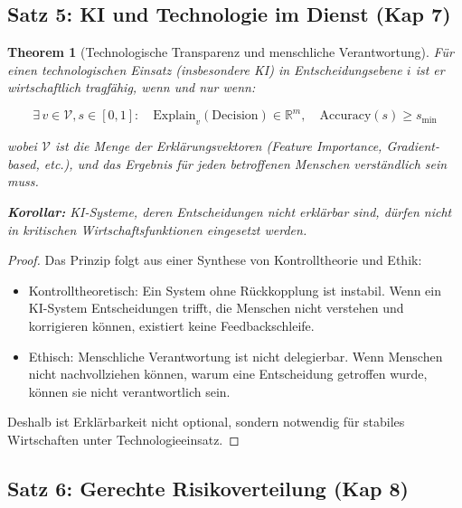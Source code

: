 \documentclass[a4paper, 12pt, twoside, openright]{report}
\newtheorem{theorem}{Theorem}[section]
\theoremstyle{definition}
\theoremstyle{definition}
\begin{document}
\subsection{Satz 5: KI und Technologie im Dienst (Kap 7)}

\begin{theorem}[Technologische Transparenz und menschliche Verantwortung]
\label{thm:technologie-transparenz}
Für einen technologischen Einsatz (insbesondere KI) in Entscheidungsebene $i$ ist er wirtschaftlich tragfähig, wenn und nur wenn:

\begin{equation}
\exists \, v \in \mathcal{V}, s \in [0,1]: \quad \text{Explain}_v(\text{Decision}) \in \mathbb{R}^m, \quad \text{Accuracy}(s) \geq s_{\min}
\end{equation}

wobei $\mathcal{V}$ ist die Menge der Erklärungsvektoren (Feature Importance, Gradient-based, etc.), und das Ergebnis für jeden betroffenen Menschen verständlich sein muss.

\textbf{Korollar:} KI-Systeme, deren Entscheidungen nicht erklärbar sind, dürfen nicht in kritischen Wirtschaftsfunktionen eingesetzt werden.
\end{theorem}

\begin{proof}
Das Prinzip folgt aus einer Synthese von Kontrolltheorie und Ethik:
\begin{itemize}
\item Kontrolltheoretisch: Ein System ohne Rückkopplung ist instabil. Wenn ein KI-System Entscheidungen trifft, die Menschen nicht verstehen und korrigieren können, existiert keine Feedbackschleife.
\item Ethisch: Menschliche Verantwortung ist nicht delegierbar. Wenn Menschen nicht nachvollziehen können, warum eine Entscheidung getroffen wurde, können sie nicht verantwortlich sein.
\end{itemize}

Deshalb ist Erklärbarkeit nicht optional, sondern notwendig für stabiles Wirtschaften unter Technologieeinsatz.
\end{proof}

\subsection{Satz 6: Gerechte Risikoverteilung (Kap 8)}
\end{document}
